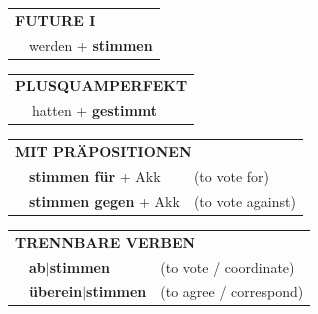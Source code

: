 \documentclass[10pt,a4paper]{revtex4-2}
\begin{document}
\begin{verbbox-dat}
\begin{tabular}{rl}
    \multicolumn{2}{l}{\textbf{FUTURE I} }\\
   & werden + \textbf{stimmen}\\
 
  \end{tabular}
\hfill
   \begin{tabular}{rl}
      \multicolumn{2}{l}{\textbf{PLUSQUAMPERFEKT}}\\
   & hatten + \textbf{gestimmt}\\
  \end{tabular}

   \vspace{10pt}

   \begin{tabular}{lll}
      \multicolumn{3}{l}{\textbf{MIT PRÄPOSITIONEN}}\\
& \textbf{stimmen für} + Akk & (to vote for)\\
& \textbf{stimmen gegen} + Akk & (to vote against)\\
\end{tabular}
  \hfill
   \begin{tabular}{lll}
      \multicolumn{3}{l}{\textbf{TRENNBARE VERBEN}}\\
 & \textbf{ab$|$stimmen} & (to vote / coordinate)\\
 & \textbf{überein$|$stimmen} & (to agree / correspond)\\
  \end{tabular}


  \vspace{-5pt}


\end{verbbox-dat}
\end{document}
